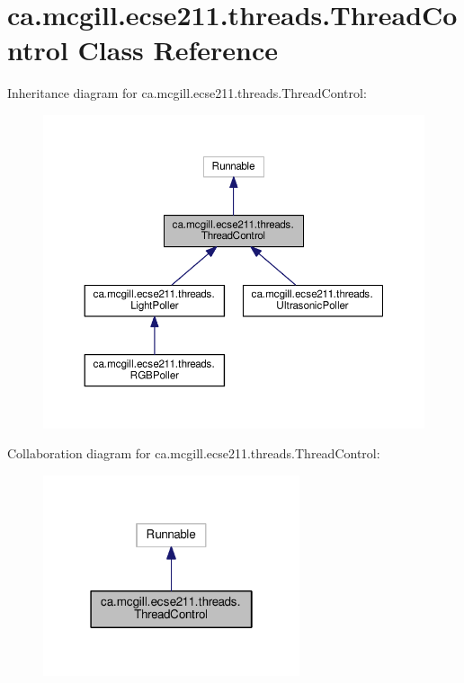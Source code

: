 \hypertarget{classca_1_1mcgill_1_1ecse211_1_1threads_1_1_thread_control}{}\section{ca.\+mcgill.\+ecse211.\+threads.\+Thread\+Control Class Reference}
\label{classca_1_1mcgill_1_1ecse211_1_1threads_1_1_thread_control}


Inheritance diagram for ca.\+mcgill.\+ecse211.\+threads.\+Thread\+Control\+:\nopagebreak
\begin{figure}[H]
\begin{center}
\leavevmode
\includegraphics[width=350pt]{classca_1_1mcgill_1_1ecse211_1_1threads_1_1_thread_control__inherit__graph}
\end{center}
\end{figure}


Collaboration diagram for ca.\+mcgill.\+ecse211.\+threads.\+Thread\+Control\+:\nopagebreak
\begin{figure}[H]
\begin{center}
\leavevmode
\includegraphics[width=214pt]{classca_1_1mcgill_1_1ecse211_1_1threads_1_1_thread_control__coll__graph}
\end{center}
\end{figure}
